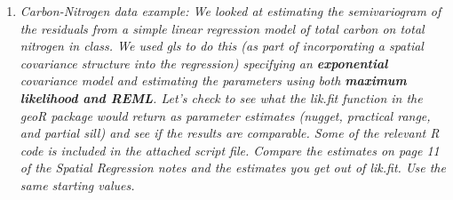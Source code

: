 \documentclass{article}\usepackage[]{graphicx}\usepackage[]{color}
\makeatletter
\newcommand{\hlnum}[1]{\textcolor[rgb]{0.686,0.059,0.569}{#1}}%
\newcommand{\hlcom}[1]{\textcolor[rgb]{0.678,0.584,0.686}{\textit{#1}}}%
\newcommand{\hlopt}[1]{\textcolor[rgb]{0,0,0}{#1}}%
\newcommand{\hlstd}[1]{\textcolor[rgb]{0.345,0.345,0.345}{#1}}%
\newcommand{\hlkwb}[1]{\textcolor[rgb]{0.69,0.353,0.396}{#1}}%
\newcommand{\hlkwd}[1]{\textcolor[rgb]{0.737,0.353,0.396}{\textbf{#1}}}%
\newenvironment{kframe}{%
 \def\at@end@of@kframe{}%
 \ifinner\ifhmode%
  \def\at@end@of@kframe{\end{minipage}}%
  \begin{minipage}{\columnwidth}%
 \fi\fi%
 \def\FrameCommand##1{\hskip\@totalleftmargin \hskip-\fboxsep
 \colorbox{shadecolor}{##1}\hskip-\fboxsep
     \hskip-\linewidth \hskip-\@totalleftmargin \hskip\columnwidth}%
 \MakeFramed {\advance\hsize-\width
   \@totalleftmargin\z@ \linewidth\hsize
   \@setminipage}}%
 {\par\unskip\endMakeFramed%
 \at@end@of@kframe}
\newenvironment{knitrout}{}{} %
\makeatother
\begin{document}
\begin{enumerate}

\item %

{\it Carbon-Nitrogen data example: We looked at estimating the semivariogram of the residuals from a simple linear regression model of total carbon on total nitrogen in class. We used gls to do this (as part of incorporating a spatial covariance structure into the regression) specifying an {\bf exponential} covariance model and estimating the parameters using both {\bf maximum likelihood and REML}. Let's check to see what the lik.fit function in the geoR package would return as parameter estimates (nugget, practical range, and partial sill) and see if the results are comparable. Some of the relevant R code is included in the attached script file. Compare the estimates on page 11 of the Spatial Regression notes and the estimates you get out of lik.fit. Use the same starting values.}


\end{enumerate}
\end{document}
